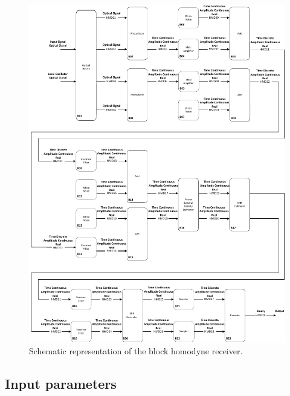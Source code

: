 \begin{figure}[h]
	\centering
	\includegraphics[width=\textwidth]{../lib/homodyne_receiver_withoutLO/figures/homodyneRx_blocks.pdf}
	\caption{Schematic representation of the block homodyne 
	receiver.}\label{fig:homodyneRx_blocks}
\end{figure}

\subsection*{Input parameters}

